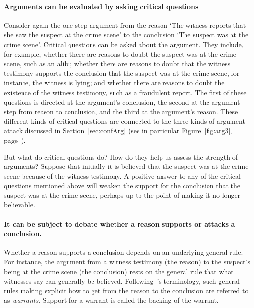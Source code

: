 \documentclass[10pt]{article}
\begin{document}


\paragraph{Arguments can be evaluated by asking critical questions} %
Consider again the one-step argument from the reason `The witness reports that she saw the suspect at the crime scene' to the conclusion `The suspect was at the crime scene'. 
Critical questions can be asked about the argument. They include, for example, whether there are reasons to doubt the suspect was at the crime scene, such as an alibi; whether there 
are reasons to doubt that the witness testimony supports the conclusion that the suspect was at the crime scene, for instance, the witness is lying; and whether there are 
reasons to doubt the existence of the witness testimony, such as a fraudulent report. The first of these questions is directed at the argument's conclusion, the second at the argument step from reason to conclusion, and the third at the argument's reason. These different kinds of critical questions are connected to the three kinds of argument attack discussed in Section~\ref{sec:confArg} (see in particular Figure~\ref{fig:arg3}, page~\pageref{fig:arg3}). 

But what do critical questions do? How do they help us assess the strength of arguments?
Suppose that initially it is believed that the suspect was at the crime scene because of the witness testimony. A positive answer to any of the critical questions mentioned 
above will weaken the support for the conclusion that the suspect was at the crime scene, perhaps up to the point of making it no longer believable.

\paragraph{It can be subject to debate whether a reason supports or attacks a conclusion.} 
Whether a reason supports a conclusion depends on an underlying general rule. For instance, the argument from a witness testimony (the reason) to the suspect's being at the crime scene (the conclusion) rests on the general rule that what witnesses say can generally be believed. Following~\citet{toulmin1958}'s terminology, such general rules making explicit how to get from the reason to the conclusion are referred to as \textit{warrants}. Support for a warrant is called the backing of the warrant.
\end{document}
